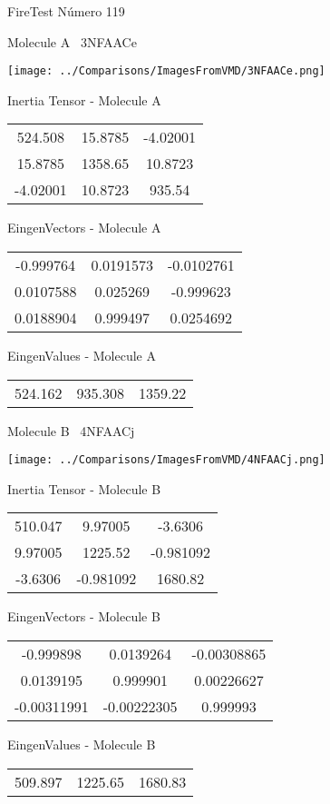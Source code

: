 \vtab[-3cm]
\begin{center}
{\large FireTest \tab Número 119}
\end{center}
\begin{multicols}{2}
\begin{center}

Molecule A \
3NFAACe

\texttt{[image: ../Comparisons/ImagesFromVMD/3NFAACe.png]}

Inertia Tensor - Molecule A \\
\begin{tabular}{|c c c|}
524.508	 & 	15.8785	 & 	-4.02001	 \\
15.8785	 & 	1358.65	 & 	10.8723	 \\
-4.02001	 & 	10.8723	 & 	935.54
\end{tabular}

\vtab
 EingenVectors - Molecule A     \\
\begin{tabular}{|c c c|}
-0.999764	 & 	0.0191573	 & 	-0.0102761	 \\
0.0107588	 & 	0.025269	 & 	-0.999623	 \\
0.0188904	 & 	0.999497	 & 	0.0254692
\end{tabular}

\vtab
 EingenValues - Molecule A     \\
\begin{tabular}{|c c c|}
524.162	 & 	935.308	 & 	1359.22	 \\
\end{tabular}
\columnbreak

Molecule B \
4NFAACj

\texttt{[image: ../Comparisons/ImagesFromVMD/4NFAACj.png]}

Inertia Tensor - Molecule B \\
\begin{tabular}{|c c c|}
510.047	 & 	9.97005	 & 	-3.6306	 \\
9.97005	 & 	1225.52	 & 	-0.981092	 \\
-3.6306	 & 	-0.981092	 & 	1680.82
\end{tabular}

\vtab
 EingenVectors - Molecule B     \\
\begin{tabular}{|c c c|}
-0.999898	 & 	0.0139264	 & 	-0.00308865	 \\
0.0139195	 & 	0.999901	 & 	0.00226627	 \\
-0.00311991	 & 	-0.00222305	 & 	0.999993
\end{tabular}

\vtab
 EingenValues - Molecule B     \\
\begin{tabular}{|c c c|}
509.897	 & 	1225.65	 & 	1680.83	 \\
\end{tabular}

\end{center}
\end{multicols}

